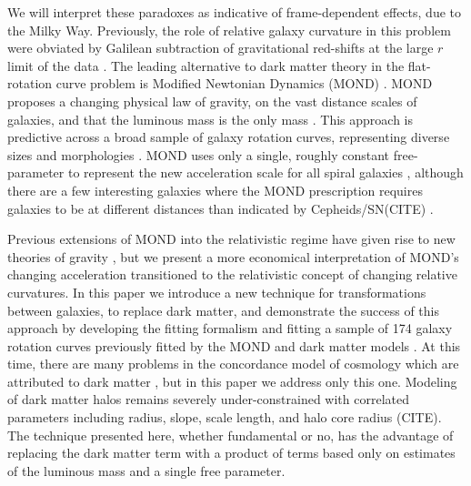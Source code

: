 \documentclass[reprint,%
 amsmath,amssymb,
 aps,
]{revtex4-1}
\begin{document}
  
  We will   interpret these paradoxes   as  indicative of  frame-dependent effects,   due to the Milky Way. 
   Previously, the role of relative
     galaxy curvature  in this problem  were    obviated 
       by  Galilean subtraction of   gravitational red-shifts at the  large $r$  limit of the data \citep{MTW}. 
     The leading   alternative    to dark matter theory  in the flat-rotation curve problem is   Modified Newtonian Dynamics (MOND) \cite{Milgrom}.  MOND    proposes    
     a changing  physical law of gravity,    on the vast distance scales of galaxies, and  that the   luminous mass is the only mass   \cite{McGaugh_2014}. 
  This approach  is   predictive across a  broad  sample of galaxy rotation curves,  representing diverse    sizes and morphologies \cite{2016Lelli}.  MOND uses only   a single, roughly constant free-parameter to represent the new acceleration scale for all spiral   galaxies  \cite{McGaugh2016RAR,2022A&A...664A..40M}, although there are a few interesting galaxies where the MOND prescription requires galaxies to be at different distances than indicated by Cepheids/SN(CITE) . 
  
  
  Previous extensions of MOND into the relativistic regime have given rise to  new theories of gravity  \cite{PhysRevD.70.083509,doi:10.1142/S0217751X0703666X,Famaey2012}, but we present   a more economical interpretation of   MOND's changing acceleration   transitioned to  the relativistic concept  of  changing   relative curvatures.   
  In this paper we   introduce a new  technique for  transformations     between galaxies,  to replace dark matter, and demonstrate the success of this approach by developing the fitting formalism and fitting   a sample of 174 galaxy rotation curves previously fitted by the MOND and dark matter models  \cite{McGaugh2016RAR,2016Lelli,McGaugh_2014,Li_2018}.  
       At this time, there are many problems in   the concordance model of   cosmology which are attributed to dark matter \cite{2010dmp..book.....S,Tully:2014gfa,Naidu_2022}, but in
 this paper we address only this  one. 
    Modeling of 
dark matter halos remains severely   under-constrained with correlated parameters including radius, slope, scale length, and halo core radius (CITE).     
The technique presented here, whether fundamental or no,  has the advantage of replacing the dark matter term  with a product of terms based only on estimates of the luminous mass and   a single free parameter.
   
      
  
 
 
\end{document}
